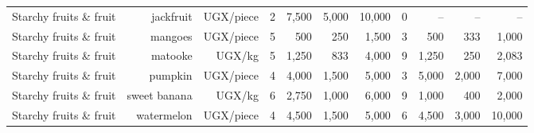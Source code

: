 \begin{table}[htbp]
\begin{tabular}{lrrrrrrrrrr}
Starchy fruits \& fruit & jackfruit & UGX/piece & 2 & 7,500 & 5,000 & 10,000 & 0 & -- & -- & -- \\
Starchy fruits \& fruit & mangoes & UGX/piece & 5 & 500 & 250 & 1,500 & 3 & 500 & 333 & 1,000 \\
Starchy fruits \& fruit & matooke & UGX/kg & 5 & 1,250 & 833 & 4,000 & 9 & 1,250 & 250 & 2,083 \\
Starchy fruits \& fruit & pumpkin & UGX/piece & 4 & 4,000 & 1,500 & 5,000 & 3 & 5,000 & 2,000 & 7,000 \\
Starchy fruits \& fruit & sweet banana & UGX/kg & 6 & 2,750 & 1,000 & 6,000 & 9 & 1,000 & 400 & 2,000 \\
Starchy fruits \& fruit & watermelon & UGX/piece & 4 & 4,500 & 1,500 & 5,000 & 6 & 4,500 & 3,000 & 10,000 \\
\bottomrule
\end{tabular}
\end{table}
